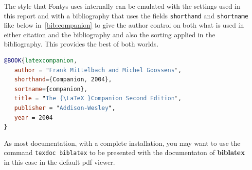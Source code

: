 The style that Fontys uses internally can be emulated with the
settings used in this report and with a bibliography that uses the
fields \texttt{shorthand} and \texttt{shortname} like below
in~\vref{bib:companion} to give the author control on both what is
used in either citation and the bibliography and also the sorting
applied in the bibliography. This provides the best of both worlds.


\begin{lstlisting}[language=BibTeX,caption={\label{bib:companion}Using \texttt{shorthand} for label and \texttt{sortname}for sorting}]
  @BOOK{latexcompanion,
   author = "Frank Mittelbach and Michel Goossens",
   shorthand={Companion, 2004},
   sortname={companion},
   title = "The {\LaTeX }Companion Second Edition",
   publisher = "Addison-Wesley",
   year = 2004
}
\end{lstlisting}


As most documentation, with a complete installation, you may want to
use the command \texttt{texdoc biblatex} to be presented with the
documentaton of \textbf{biblatex} in this case in the default pdf viewer.


